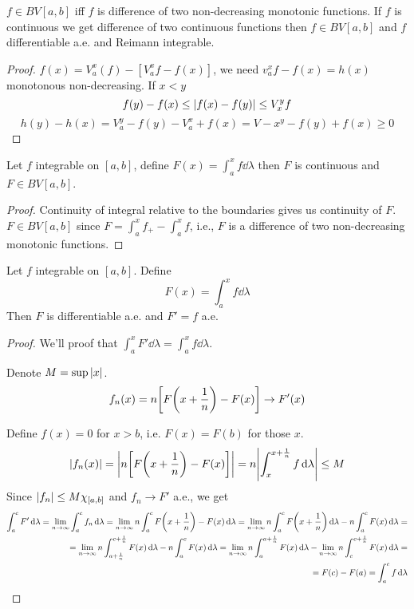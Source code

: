 \begin{theorem}
	$f\in BV[a,b]$ iff $f$ is difference of two non-decreasing monotonic functions. If $f$ is continuous we get difference of two continuous functions then $f\in BV[a,b]$ and $f$ differentiable a.e. and Reimann integrable.
	
	\begin{proof}
		$f(x) = V_a^x(f) - [V_a^xf - f(x)]$, we need $v_a^x f - f(x) = h(x)$ monotonous non-decreasing. If $x<y$
		$$f(y)-f(x) \leq \abs{f(x) -f(y)}\leq V_x^yf$$
		$$h(y)-h(x) = V_a^y - f(y) - V_a^x +f(x) = V-x^y - f(y) +f(x) \geq 0$$
	\end{proof}
\end{theorem}

\begin{prop}
	Let $f$ integrable on $[a,b]$, define $F(x) = \int_a^x f \dd{\lambda}$ then $F$ is continuous and $F\in BV[a,b]$.
	
	\begin{proof}
		Continuity of integral relative to the boundaries gives us continuity of $F$. $F\in BV[a,b]$ since $F = \int_a^x f_+ - \int_a^x f$, i.e., $F$ is a difference of two non-decreasing monotonic functions.
	\end{proof}
\end{prop}

\begin{theorem}
	Let $f$ integrable on $[a,b]$. Define
	$$F(x) = \int_a^x f \dd{\lambda}$$
	Then $F$ is differentiable a.e. and $F'=f$ a.e.
	
	\begin{proof}
		We'll proof that $\int_a^x F' \dd{\lambda} = \int_a^x f \dd{\lambda} $.
		
		Denote $M = \sup \abs{x}$. 
		$$f_n(x) = n\qty[F\qty(x+\frac{1}{n}) -F(x)] \to F'(x)$$
		
		Define $f(x) = 0$ for $x>b$, i.e. $F(x) = F(b)$ for those $x$.
		$$\abs{f_n(x)} = \abs{n\qty[F\qty(x+\frac{1}{n}) -F(x)] } = n\abs{\int_x^{x+\frac{1}{n}} f\dd{\lambda} } \leq M$$
		Since $\abs{f_n} \leq M \chi_{[a,b]} $ and $f_n\to F'$ a.e., we get
		\begin{align*}
		\int_a^c F' \dd{\lambda} = \lim_{n\to \infty} \int_a^c f_n \dd{\lambda} = \lim_{n\to \infty} n\int_a^c F\qty(x+\frac{1}{n}) - F(x) \dd{\lambda} =\lim_{n\to \infty} n\int_a^c F\qty(x+\frac{1}{n})\dd{\lambda} -n\int_a^c F(x) \dd{\lambda}=\\=\lim_{n\to \infty} n\int_{a+\frac{1}{n}}^{c+\frac{1}{n}} F\qty(x)\dd{\lambda} -n\int_a^c F(x) \dd{\lambda} = \lim_{n\to \infty} n\int_{a}^{a+\frac{1}{n}} F\qty(x)\dd{\lambda} - \lim_{n\to \infty} n\int_{c}^{c+\frac{1}{n}} F\qty(x)\dd{\lambda} =\\= F(c) - F(a) = \int_a^c f \dd{\lambda}
		\end{align*}
	\end{proof}
\end{theorem}